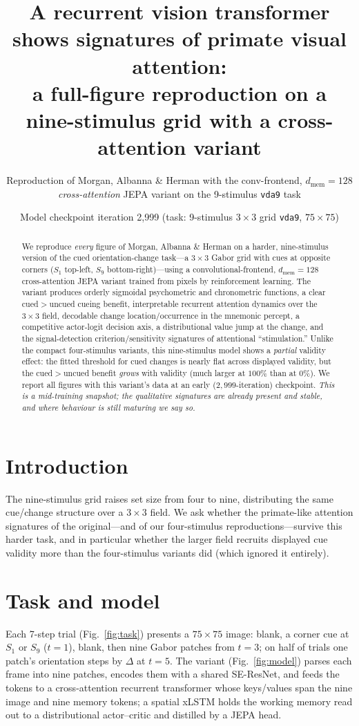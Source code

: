 \documentclass[11pt]{article}
\title{\textbf{A recurrent vision transformer shows signatures of primate visual attention:\\
a full-figure reproduction on a nine-stimulus grid with a cross-attention variant}}
\author{Reproduction of Morgan, Albanna \& Herman with the conv-frontend, $d_{\mathrm{mem}}{=}128$ \emph{cross-attention} JEPA variant on the 9-stimulus \texttt{vda9} task}
\date{Model checkpoint iteration 2{,}999 (task: 9-stimulus $3\times3$ grid \texttt{vda9}, $75\times75$)}
\begin{document}
\maketitle
\begin{abstract}\noindent
We reproduce \emph{every} figure of Morgan, Albanna \& Herman on a harder, nine-stimulus version of the
cued orientation-change task---a $3\times3$ Gabor grid with cues at opposite corners ($S_1$ top-left,
$S_9$ bottom-right)---using a convolutional-frontend, $d_{\mathrm{mem}}{=}128$ cross-attention JEPA
variant trained from pixels by reinforcement learning. The variant produces orderly sigmoidal
psychometric and chronometric functions, a clear cued$>$uncued cueing benefit, interpretable recurrent
attention dynamics over the $3\times3$ field, decodable change location/occurrence in the mnemonic
percept, a competitive actor-logit decision axis, a distributional value jump at the change, and the
signal-detection criterion/sensitivity signatures of attentional ``stimulation.'' Unlike the compact
four-stimulus variants, this nine-stimulus model shows a \emph{partial} validity effect: the fitted
threshold for cued changes is nearly flat across displayed validity, but the cued$>$uncued benefit
\emph{grows} with validity (much larger at $100\%$ than at $0\%$). We report all figures with this
variant's data at an early ($2{,}999$-iteration) checkpoint. \emph{This is a mid-training snapshot; the
qualitative signatures are already present and stable, and where behaviour is still maturing we say so.}
\end{abstract}

\section{Introduction}
The nine-stimulus grid raises set size from four to nine, distributing the same cue/change structure
over a $3\times3$ field. We ask whether the primate-like attention signatures of the original---and of
our four-stimulus reproductions---survive this harder task, and in particular whether the larger field
recruits displayed cue validity more than the four-stimulus variants did (which ignored it entirely).

\section{Task and model}
Each 7-step trial (Fig.~\ref{fig:task}) presents a $75\times75$ image: blank, a corner cue at $S_1$ or
$S_9$ ($t{=}1$), blank, then nine Gabor patches from $t{=}3$; on half of trials one patch's orientation
steps by $\Delta$ at $t{=}5$. The variant (Fig.~\ref{fig:model}) parses each frame into nine patches,
encodes them with a shared SE-ResNet, and feeds the tokens to a cross-attention recurrent transformer
whose keys/values span the nine image and nine memory tokens; a spatial xLSTM holds the working memory
read out to a distributional actor--critic and distilled by a JEPA head.
\end{document}
